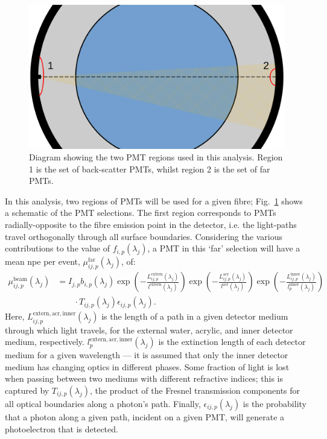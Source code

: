 \begin{figure}
    \centering
    \includegraphics[width=\textwidth]{5_SMELLIEAnalysis/images/smellie_ext_length_pmt_selection_schematic.pdf}
    \caption[Diagram showing the two PMT regions used in the SMELLIE extinction length analysis]
    {Diagram showing the two PMT regions used in this analysis. Region 1 is the set of back-scatter PMTs, whilst region 2 is the set of far PMTs.}
    \label{fig:smellie_ext_length_schematic}
\end{figure}

In this analysis, two regions of PMTs will be used for a given fibre; Fig.~\ref{fig:smellie_ext_length_schematic} shows a schematic of the PMT selections. The first region corresponds to PMTs radially-opposite to the fibre emission point in the detector, i.e. the light-paths travel orthogonally through all surface boundaries.  Considering the various contributions to the value of $f_{i,p}(\lambda_{j})$, a PMT in this `far' selection will have a mean npe per event, $\mu_{ij,p}^{\mathrm{far}}(\lambda_{j})$, of:
\begin{align}\label{eq:smellie_ext_length_theory}
    \mu_{ij,p}^{\mathrm{beam}}(\lambda_{j}) &= I_{j,p}b_{i,p}(\lambda_{j})
    \exp\left(
        -\frac{L_{ij,p}^{\mathrm{extern}}(\lambda_{j})}{l^{\mathrm{extern}}(\lambda_{j})}
    \right)
    \exp\left(
        -\frac{L_{ij,p}^{\mathrm{acr}}(\lambda_{j})}{l^{\mathrm{acr}}(\lambda_{j})}
    \right)
    \exp\left(
        -\frac{L_{ij,p}^{\mathrm{inner}}(\lambda_{j})}{l_{p}^{\mathrm{inner}}(\lambda_{j})}
    \right)\nonumber\\
    & \qquad\cdot T_{ij,p}(\lambda_{j})\epsilon_{ij,p}(\lambda_{j}).
\end{align}
Here, $L_{ij,p}^{\mathrm{extern,acr,inner}}(\lambda_{j})$ is the length of a path in a given detector medium through which light travels, for the external water, acrylic, and inner detector medium, respectively. $l_{p}^{\mathrm{extern,acr,inner}}(\lambda_{j})$ is the extinction length of each detector medium for a given wavelength --- it is assumed that only the inner detector medium has changing optics in different phases. Some fraction of light is lost when passing between two mediums with different refractive indices; this is captured by $T_{ij,p}(\lambda_{j})$, the product of the Fresnel transmission components for all optical boundaries along a photon's path. Finally, $\epsilon_{ij,p}(\lambda_{j})$ is the probability that a photon along a given path, incident on a given PMT, will generate a photoelectron that is detected. 


